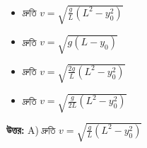 \documentclass[12pt, a4paper]{article}
\begin{document}
\begin{itemize}[label={}, leftmargin=1cm, itemsep=0.5em]
    \item[\textbf{A)}] দ্রুতি $v = \sqrt{\frac{g}{L} (L^2 - y_0^2)}$
    \item[\textbf{B)}] দ্রুতি $v = \sqrt{g (L - y_0)}$
    \item[\textbf{C)}] দ্রুতি $v = \sqrt{\frac{2g}{L} (L^2 - y_0^2)}$
    \item[\textbf{D)}] দ্রুতি $v = \sqrt{\frac{g}{2L} (L^2 - y_0^2)}$
\end{itemize}

\vspace{0.5em}
\begin{tcolorbox}[answerbox]
    \textbf{\color{success} উত্তর:} A) দ্রুতি $v = \sqrt{\frac{g}{L} (L^2 - y_0^2)}$
\end{tcolorbox}
\vspace{1em}
\end{document}
